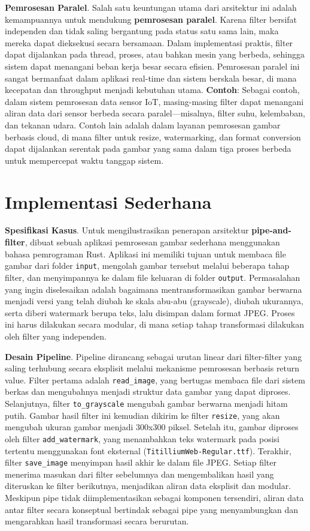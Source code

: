 \textbf{Pemrosesan Paralel}.  
Salah satu keuntungan utama dari arsitektur ini adalah kemampuannya untuk mendukung \textbf{pemrosesan paralel}. Karena filter bersifat independen dan tidak saling bergantung pada status satu sama lain, maka mereka dapat dieksekusi secara bersamaan. Dalam implementasi praktis, filter dapat dijalankan pada thread, proses, atau bahkan mesin yang berbeda, sehingga sistem dapat menangani beban kerja besar secara efisien. Pemrosesan paralel ini sangat bermanfaat dalam aplikasi real-time dan sistem berskala besar, di mana kecepatan dan throughput menjadi kebutuhan utama.  
\textbf{Contoh}: Sebagai contoh, dalam sistem pemrosesan data sensor IoT, masing-masing filter dapat menangani aliran data dari sensor berbeda secara paralel—misalnya, filter suhu, kelembaban, dan tekanan udara. Contoh lain adalah dalam layanan pemrosesan gambar berbasis cloud, di mana filter untuk resize, watermarking, dan format conversion dapat dijalankan serentak pada gambar yang sama dalam tiga proses berbeda untuk mempercepat waktu tanggap sistem.



\section{Implementasi Sederhana}

\textbf{Spesifikasi Kasus}.  
Untuk mengilustrasikan penerapan arsitektur \textbf{pipe-and-filter}, dibuat sebuah aplikasi pemrosesan gambar sederhana menggunakan bahasa pemrograman Rust. Aplikasi ini memiliki tujuan untuk membaca file gambar dari folder \texttt{input}, mengolah gambar tersebut melalui beberapa tahap filter, dan menyimpannya ke dalam file keluaran di folder \texttt{output}. Permasalahan yang ingin diselesaikan adalah bagaimana mentransformasikan gambar berwarna menjadi versi yang telah diubah ke skala abu-abu (grayscale), diubah ukurannya, serta diberi watermark berupa teks, lalu disimpan dalam format JPEG. Proses ini harus dilakukan secara modular, di mana setiap tahap transformasi dilakukan oleh filter yang independen.

\textbf{Desain Pipeline}.  
Pipeline dirancang sebagai urutan linear dari filter-filter yang saling terhubung secara eksplisit melalui mekanisme pemrosesan berbasis return value. Filter pertama adalah \texttt{read\_image}, yang bertugas membaca file dari sistem berkas dan mengubahnya menjadi struktur data gambar yang dapat diproses. Selanjutnya, filter \texttt{to\_grayscale} mengubah gambar berwarna menjadi hitam putih. Gambar hasil filter ini kemudian dikirim ke filter \texttt{resize}, yang akan mengubah ukuran gambar menjadi 300x300 piksel. Setelah itu, gambar diproses oleh filter \texttt{add\_watermark}, yang menambahkan teks watermark pada posisi tertentu menggunakan font eksternal (\texttt{TitilliumWeb-Regular.ttf}). Terakhir, filter \texttt{save\_image} menyimpan hasil akhir ke dalam file JPEG. Setiap filter menerima masukan dari filter sebelumnya dan mengembalikan hasil yang diteruskan ke filter berikutnya, menjadikan aliran data eksplisit dan modular. Meskipun pipe tidak diimplementasikan sebagai komponen tersendiri, aliran data antar filter secara konseptual bertindak sebagai pipe yang menyambungkan dan mengarahkan hasil transformasi secara berurutan.


